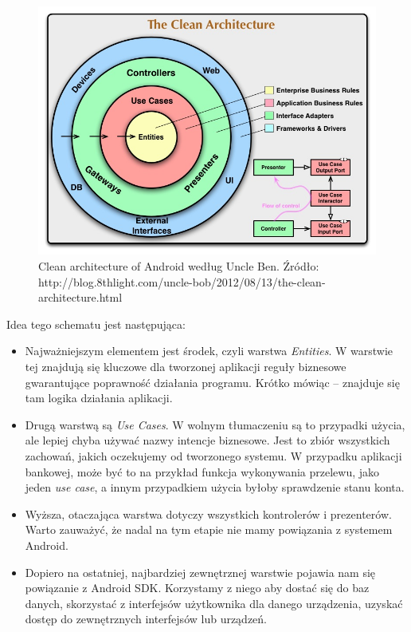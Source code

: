 \begin{figure}[!htb]
    \centering
    \includegraphics[width=13cm]{imgs/ch4_clean_architecture.jpg}
    \caption
{Clean architecture of Android według Uncle Ben. Źródło: http://blog.8thlight.com/uncle-bob/2012/08/13/the-clean-architecture.html}
    \label{fig:clean_architecture}
\end{figure} 

Idea tego schematu jest następująca:

\begin{itemize}

\item
Najważniejszym elementem jest środek, czyli warstwa \textit{Entities}. W warstwie tej znajdują się kluczowe dla tworzonej aplikacji reguły biznesowe gwarantujące poprawność działania programu. Krótko mówiąc – znajduje się tam logika działania aplikacji.
\item
Drugą warstwą są \textit{Use Cases}. W wolnym tłumaczeniu są to przypadki użycia, ale lepiej chyba używać nazwy intencje biznesowe. Jest to zbiór wszystkich zachowań, jakich oczekujemy od tworzonego systemu. W przypadku aplikacji bankowej, może być to na przykład funkcja wykonywania przelewu, jako jeden \textit{use case}, a innym przypadkiem użycia byłoby sprawdzenie stanu konta.
\item
Wyższa, otaczająca warstwa dotyczy wszystkich kontrolerów i prezenterów. Warto zauważyć, że nadal na tym etapie nie mamy powiązania z systemem Android.
\item
Dopiero na ostatniej, najbardziej zewnętrznej warstwie pojawia nam się powiązanie z Android SDK. Korzystamy z niego aby dostać się do baz danych, skorzystać z interfejsów użytkownika dla danego urządzenia, uzyskać dostęp do zewnętrznych interfejsów lub urządzeń.
\end{itemize}

